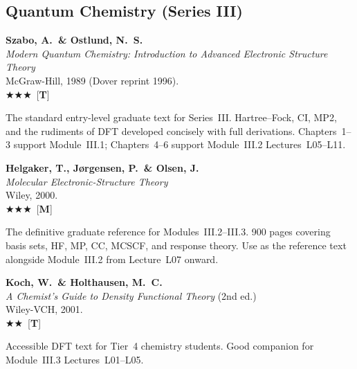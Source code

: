 \documentclass[11pt,a4paper]{article}
\newcommand{\essential}{$\bigstar\bigstar\bigstar$}
\newcommand{\recommended}{$\bigstar\bigstar$}
\newenvironment{bibentry}[1]{\begin{tcolorbox}[entrybox=#1,top=4pt,bottom=4pt]}{\end{tcolorbox}\smallskip}
\begin{document}
\subsection{Quantum Chemistry (Series III)}

\begin{bibentry}{t4light}
\textbf{Szabo, A.\ \& Ostlund, N.~S.}\\
\textit{Modern Quantum Chemistry: Introduction to Advanced Electronic Structure Theory}\\
McGraw-Hill, 1989 (Dover reprint 1996).\\[3pt]
\essential\ [\textbf{T}]\\[3pt]
\begin{tcolorbox}[annotbox]
The standard entry-level graduate text for Series~III. Hartree--Fock, CI, MP2,
and the rudiments of DFT developed concisely with full derivations. Chapters~1--3
support Module~III.1; Chapters~4--6 support Module~III.2 Lectures~L05--L11.
\end{tcolorbox}
\end{bibentry}

\begin{bibentry}{t4light}
\textbf{Helgaker, T., J\o rgensen, P.\ \& Olsen, J.}\\
\textit{Molecular Electronic-Structure Theory}\\
Wiley, 2000.\\[3pt]
\essential\ [\textbf{M}]\\[3pt]
\begin{tcolorbox}[annotbox]
The definitive graduate reference for Modules~III.2--III.3. 900 pages covering
basis sets, HF, MP, CC, MCSCF, and response theory. Use as the reference text
alongside Module~III.2 from Lecture~L07 onward.
\end{tcolorbox}
\end{bibentry}

\begin{bibentry}{t4light}
\textbf{Koch, W.\ \& Holthausen, M.~C.}\\
\textit{A Chemist's Guide to Density Functional Theory} (2nd ed.)\\
Wiley-VCH, 2001.\\[3pt]
\recommended\ [\textbf{T}]\\[3pt]
\begin{tcolorbox}[annotbox]
Accessible DFT text for Tier~4 chemistry students. Good companion for
Module~III.3 Lectures~L01--L05.
\end{tcolorbox}
\end{bibentry}
\end{document}
